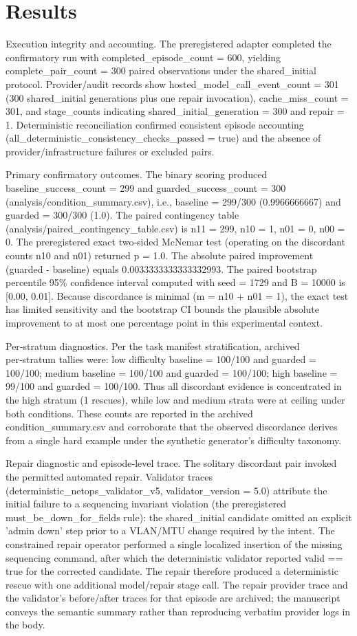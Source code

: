 \documentclass[conference]{IEEEtran}
\begin{document}
\section{Results}
Execution integrity and accounting. The preregistered adapter completed the confirmatory run with completed\_episode\_count = 600, yielding complete\_pair\_count = 300 paired observations under the shared\_initial protocol. Provider/audit records show hosted\_model\_call\_event\_count = 301 (300 shared\_initial generations plus one repair invocation), cache\_miss\_count = 301, and stage\_counts indicating shared\_initial\_generation = 300 and repair = 1. Deterministic reconciliation confirmed consistent episode accounting (all\_deterministic\_consistency\_checks\_passed = true) and the absence of provider/infrastructure failures or excluded pairs.

Primary confirmatory outcomes. The binary scoring produced baseline\_success\_count = 299 and guarded\_success\_count = 300 (analysis/condition\_summary.csv), i.e., baseline = 299/300 (0.9966666667) and guarded = 300/300 (1.0). The paired contingency table (analysis/paired\_contingency\_table.csv) is n11 = 299, n10 = 1, n01 = 0, n00 = 0. The preregistered exact two‑sided McNemar test (operating on the discordant counts n10 and n01) returned p = 1.0. The absolute paired improvement (guarded - baseline) equals 0.0033333333333332993. The paired bootstrap percentile 95\% confidence interval computed with seed = 1729 and B = 10000 is [0.00, 0.01]. Because discordance is minimal (m = n10 + n01 = 1), the exact test has limited sensitivity and the bootstrap CI bounds the plausible absolute improvement to at most one percentage point in this experimental context.

Per‑stratum diagnostics. Per the task manifest stratification, archived per‑stratum tallies were: low difficulty baseline = 100/100 and guarded = 100/100; medium baseline = 100/100 and guarded = 100/100; high baseline = 99/100 and guarded = 100/100. Thus all discordant evidence is concentrated in the high stratum (1 rescues), while low and medium strata were at ceiling under both conditions. These counts are reported in the archived condition\_summary.csv and corroborate that the observed discordance derives from a single hard example under the synthetic generator's difficulty taxonomy.

Repair diagnostic and episode‑level trace. The solitary discordant pair invoked the permitted automated repair. Validator traces (deterministic\_netops\_validator\_v5, validator\_version = 5.0) attribute the initial failure to a sequencing invariant violation (the preregistered must\_be\_down\_for\_fields rule): the shared\_initial candidate omitted an explicit 'admin down' step prior to a VLAN/MTU change required by the intent. The constrained repair operator performed a single localized insertion of the missing sequencing command, after which the deterministic validator reported valid == true for the corrected candidate. The repair therefore produced a deterministic rescue with one additional model/repair stage call. The repair provider trace and the validator's before/after traces for that episode are archived; the manuscript conveys the semantic summary rather than reproducing verbatim provider logs in the body.
\end{document}
